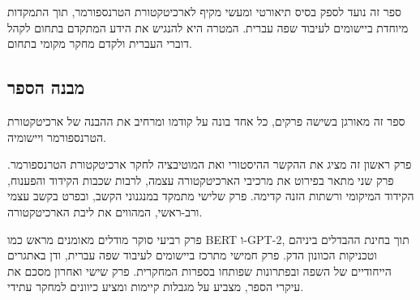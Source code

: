 ספר זה נועד לספק בסיס תיאורטי ומעשי מקיף לארכיטקטורת הטרנספורמר, תוך
התמקדות מיוחדת ביישומים לעיבוד שפה עברית. המטרה היא להנגיש את הידע
המתקדם בתחום לקהל דוברי העברית ולקדם מחקר מקומי בתחום.

\hypertarget{ux5deux5d1ux5e0ux5d4-ux5d4ux5e1ux5e4ux5e8}{%
\subsection{מבנה הספר}\label{ux5deux5d1ux5e0ux5d4-ux5d4ux5e1ux5e4ux5e8}}

ספר זה מאורגן בשישה פרקים, כל אחד בונה על קודמו ומרחיב את ההבנה של
ארכיטקטורת הטרנספורמר ויישומיה.

פרק ראשון זה מציג את ההקשר ההיסטורי ואת המוטיבציה לחקר ארכיטקטורת
הטרנספורמר. פרק שני מתאר בפירוט את מרכיבי הארכיטקטורה עצמה, לרבות שכבות
הקידוד והפענוח, הקידוד המיקומי ורשתות הזנה קדימה. פרק שלישי מתמקד
במנגנוני הקשב, ובפרט בקשב עצמי ורב-ראשי, המהווים את ליבת הארכיטקטורה.

פרק רביעי סוקר מודלים מאומנים מראש כמו BERT ו-GPT-2, תוך בחינת ההבדלים
ביניהם וטכניקות הכוונון הדק. פרק חמישי מתרכז ביישומים לעיבוד שפה עברית,
ודן באתגרים הייחודיים של השפה ובפתרונות שפותחו בספרות המחקרית. פרק שישי
ואחרון מסכם את עיקרי הספר, מצביע על מגבלות קיימות ומציע כיוונים למחקר
עתידי.
